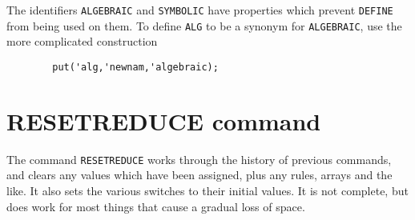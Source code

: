 The identifiers \texttt{ALGEBRAIC} and \texttt{SYMBOLIC} have properties which
prevent \texttt{DEFINE} from being used on them.  To define
\texttt{ALG} to be a synonym for \texttt{ALGEBRAIC}, use the more complicated
construction
\begin{verbatim}
        put('alg,'newnam,'algebraic);
\end{verbatim}

\section{RESETREDUCE command}
\hypertarget{command:RESETREDUCE}{}

The command \texttt{RESETREDUCE} works through the                                                                                                                     
history of previous commands, and clears any values which have been
assigned, plus any rules, arrays and the like.  It also sets the various
switches to their initial values.  It is not complete, but does work for
most things that cause a gradual loss of space. 
